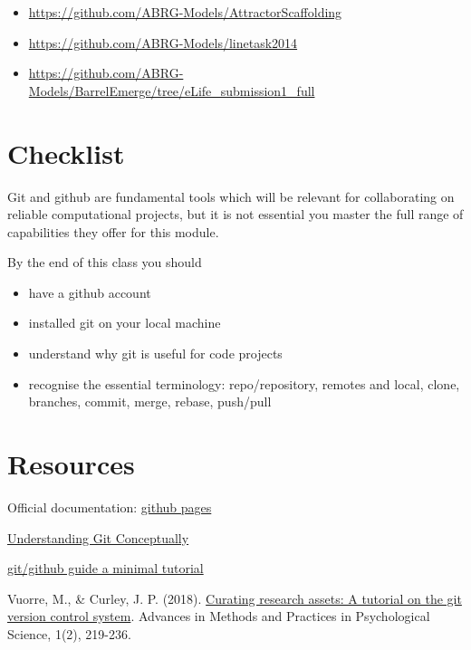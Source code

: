 \documentclass[
]{book}
\providecommand{\tightlist}{%
  \setlength{\itemsep}{0pt}\setlength{\parskip}{0pt}}
\begin{document}
\begin{itemize}
\tightlist
\item
  \url{https://github.com/ABRG-Models/AttractorScaffolding}
\item
  \url{https://github.com/ABRG-Models/linetask2014}
\item
  \url{https://github.com/ABRG-Models/BarrelEmerge/tree/eLife_submission1_full}
\end{itemize}

\hypertarget{checklist-7}{%
\section{Checklist}\label{checklist-7}}

Git and github are fundamental tools which will be relevant for collaborating on reliable computational projects, but it is not essential you master the full range of capabilities they offer for this module.

By the end of this class you should

\begin{itemize}
\tightlist
\item
  have a github account
\item
  installed git on your local machine
\item
  understand why git is useful for code projects
\item
  recognise the essential terminology: repo/repository, remotes and local, clone, branches, commit, merge, rebase, push/pull
\end{itemize}

\hypertarget{resources-8}{%
\section{Resources}\label{resources-8}}

Official documentation: \href{https://help.github.com/en/github/working-with-github-pages}{github pages}

\href{https://www.sbf5.com/~cduan/technical/git/}{Understanding Git Conceptually}

\href{https://kbroman.org/github_tutorial/}{git/github guide a minimal tutorial}

Vuorre, M., \& Curley, J. P. (2018). \href{https://journals.sagepub.com/doi/full/10.1177/2515245918754826}{Curating research assets: A tutorial on the git version control system}. Advances in Methods and Practices in Psychological Science, 1(2), 219-236.
\end{document}
